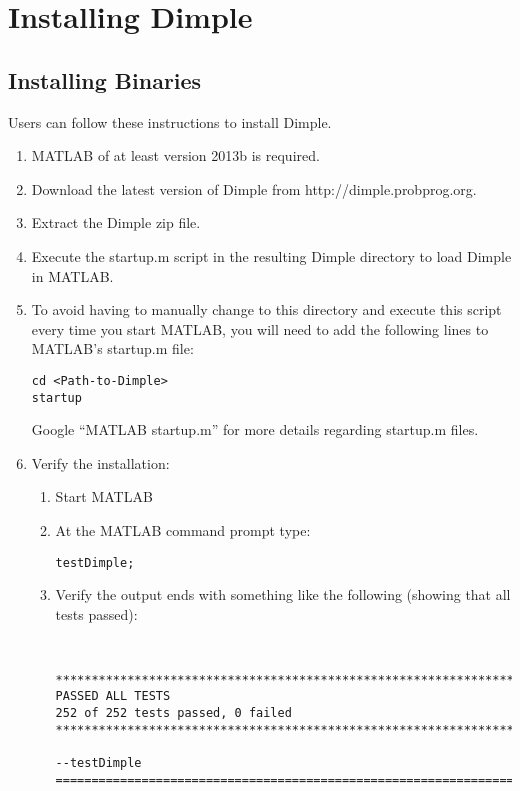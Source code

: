 \section{Installing Dimple}


\subsection{Installing Binaries}

Users can follow these instructions to install Dimple.

\ifmatlab

\begin{enumerate}
\item MATLAB of at least version 2013b is required.
\item Download the latest version of Dimple from http://dimple.probprog.org.
\item Extract the Dimple zip file.
\item Execute the startup.m script in the resulting Dimple directory to 
load Dimple in MATLAB.
\item To avoid having to manually change to this directory and execute 
this script every time you start MATLAB, you will need to add the following lines to MATLAB's startup.m file:
\begin{lstlisting}
cd <Path-to-Dimple>
startup
\end{lstlisting}
Google ``MATLAB startup.m'' for more details regarding startup.m files.
\item Verify the installation:
\begin{enumerate}
\item Start MATLAB
\item  At the MATLAB command prompt type:
\begin{lstlisting} 
testDimple;
\end{lstlisting}
\item Verify the output ends with something like the following (showing that all tests passed): \\
\begin{minipage}{\textwidth}
\begin{lstlisting} 


**********************************************************************
PASSED ALL TESTS
252 of 252 tests passed, 0 failed
**********************************************************************

--testDimple
======================================================================
\end{lstlisting}
\end{minipage}

\end{enumerate}
\end{enumerate}


